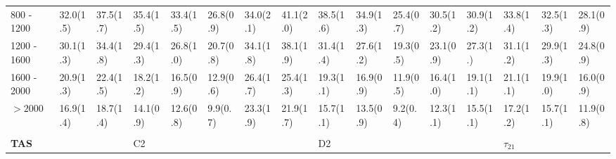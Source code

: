 \begin{table}
{\begin{tabular}{llllllllllllllll}
\multicolumn{1}{l||}{800 - 1200} & 	\multicolumn{1}{l|}{32.0(1.5)} & 	 \multicolumn{1}{l|}{37.5(1.7)} & 		\multicolumn{1}{l|}{35.4(1.5)} & 	 \multicolumn{1}{l|}{33.4(1.5)} & 	  \multicolumn{1}{l||}{26.8(0.9)} &  	\multicolumn{1}{l|}{34.0(2.1)} & 	\multicolumn{1}{l|}{41.1(2.0)} & 		\multicolumn{1}{l|}{38.5(1.6)} & 		\multicolumn{1}{l|}{34.9(1.3)} & 	 \multicolumn{1}{l||}{25.4(0.7)} & 	   \multicolumn{1}{l|}{30.5(1.2)} & \multicolumn{1}{l|}{30.9(1.2)} & \multicolumn{1}{l|}{33.8(1.4)} & \multicolumn{1}{l|}{32.5(1.3)} & \multicolumn{1}{l|}{28.1(0.9)} \\
\multicolumn{1}{l||}{1200 - 1600} & \multicolumn{1}{l|}{30.1(1.3)} & 	 \multicolumn{1}{l|}{34.4(1.8)} & 		\multicolumn{1}{l|}{29.4(1.3)} & 	 \multicolumn{1}{l|}{26.8(1.0)} & 	  \multicolumn{1}{l||}{20.7(0.8)} &  	\multicolumn{1}{l|}{34.1(1.8)} & 	\multicolumn{1}{l|}{38.1(1.9)} & 		\multicolumn{1}{l|}{31.4(1.4)} & 		\multicolumn{1}{l|}{27.6(1.2)} & 	 \multicolumn{1}{l||}{19.3(0.5)} & 	   \multicolumn{1}{l|}{23.1(0.9)} & \multicolumn{1}{l|}{27.3(1.)} & \multicolumn{1}{l|}{31.1(1.2)} & \multicolumn{1}{l|}{29.9(1.3)} & \multicolumn{1}{l|}{24.8(0.9)} \\
\multicolumn{1}{l||}{1600 - 2000} & \multicolumn{1}{l|}{20.9(1.3)} & 	 \multicolumn{1}{l|}{22.4(1.5)} & 		\multicolumn{1}{l|}{18.2(1.2)} & 	 \multicolumn{1}{l|}{16.5(0.9)} & 	  \multicolumn{1}{l||}{12.9(0.6)} &  	\multicolumn{1}{l|}{26.4(1.7)} & 	\multicolumn{1}{l|}{25.4(1.3)} & 		\multicolumn{1}{l|}{19.3(1.1)} & 		\multicolumn{1}{l|}{16.9(0.9)} & 	 \multicolumn{1}{l||}{11.9(0.5)} & 	   \multicolumn{1}{l|}{16.4(1.0)} & \multicolumn{1}{l|}{19.1(1.1)} & \multicolumn{1}{l|}{21.1(1.1)} & \multicolumn{1}{l|}{19.9(1.0)} & \multicolumn{1}{l|}{16.0(0.9)} \\
\multicolumn{1}{l||}{$>2000$} & 	\multicolumn{1}{l|}{16.9(1.4)} & 	 \multicolumn{1}{l|}{18.7(1.4)} & 		\multicolumn{1}{l|}{14.1(0.9)} & 	 \multicolumn{1}{l|}{12.6(0.8)} & 	  \multicolumn{1}{l||}{9.9(0.7)} & 		\multicolumn{1}{l|}{23.3(1.9)} & 	\multicolumn{1}{l|}{21.9(1.7)} & 		\multicolumn{1}{l|}{15.7(1.1)} & 		\multicolumn{1}{l|}{13.5(0.9)} & 	 \multicolumn{1}{l||}{9.2(0.4)} & 	   \multicolumn{1}{l|}{12.3(1.1)} & \multicolumn{1}{l|}{15.5(1.1)} & \multicolumn{1}{l|}{17.2(1.2)} & \multicolumn{1}{l|}{15.7(1.1)} & \multicolumn{1}{l|}{11.9(0.8)} \\ \hline
 &  &  &  &  &  &  &  &  &  &  &  &  &  &  &  \\
 \multicolumn{1}{l||}{\textbf{TAS}} &  &  & C2 &  & \multicolumn{1}{l||}{} &  &  & D2 &  & \multicolumn{1}{l||}{} &  &  & $\tau_{21}$ &  & \multicolumn{1}{l|}{} \\ \hline

\end{tabular}}
\end{table}
